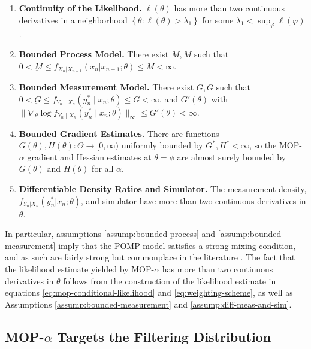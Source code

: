 \documentclass[numsec,webpdf,modern,medium,namedate]{oup-authoring-template}
\newcommand\arxiv[2]{#2} %
\theoremstyle{thmstyleone}%
\theoremstyle{thmstyletwo}%
\theoremstyle{thmstylethree}%
\begin{document}
\arxiv{}{\vspace*{-3ex}}
\begin{enumerate}[label=(A\arabic*),itemsep=-1ex, , font=\small] 
    \item \textbf{Continuity of the Likelihood.} $\ell(\theta)$ has more than two continuous derivatives in a neighborhood $\left\{\theta: \ell(\theta)>\lambda_1\right\}$ for some $\lambda_1<\sup _{\varphi} \ell(\varphi)$.\label{assump:conti-lik}
    \item \textbf{Bounded Process Model.} There exist $\underbar{M}, \bar{M}$ such that $0 < \underbar{M} \leq f_{X_n|X_{n-1}}(x_n | x_{n-1};\theta) \leq \bar{M} < \infty$.\label{assump:bounded-process}
    \item \textbf{Bounded Measurement Model.} There exist $\underbar{G}, \bar{G}$ such that $0<\underbar{G} \leq f_{Y_n \mid X_n}\left(y_n^* \mid x_n; \theta\right) \leq \bar{G}<\infty$, and $G'(\theta)$ with $\|\nabla_\theta \log f_{Y_n \mid X_n}\left(y_n^* \mid x_n; \theta\right)\|_\infty \leq G'(\theta)< \infty$.\label{assump:bounded-measurement}
    \item \textbf{Bounded Gradient Estimates.} There are functions $G(\theta), H(\theta): \Theta \to [0,\infty)$ uniformly bounded by $G^*, H^*<\infty$, so the MOP-$\alpha$ gradient and Hessian estimates at $\theta=\phi$ are almost surely bounded by $G(\theta)$ and $H(\theta)$ for all $\alpha$.\label{assump:local-bounded-derivative}
    \item \textbf{Differentiable Density Ratios and Simulator.} The measurement density, \arxiv{\\}{}$f_{Y_n|X_n}(y_n^*|x_n; \theta)$, and simulator have more than two continuous derivatives in $\theta$.\label{assump:diff-meas-and-sim}
\end{enumerate}
\arxiv{}{\vspace*{-3ex}}

In particular, assumptions \ref{assump:bounded-process} and \ref{assump:bounded-measurement} imply that the POMP model satisfies a strong mixing condition, and as such are fairly strong but commonplace in the literature \citep{karjalainen23, delMoral04}. The fact that the likelihood estimate yielded by MOP-$\alpha$ has more than two continuous derivatives in $\theta$ follows from the construction of the likelihood estimate in equations \ref{eq:mop-conditional-likelihood} and \ref{eq:weighting-scheme}, as well as Assumptions \ref{assump:bounded-measurement} and \ref{assump:diff-meas-and-sim}. 


\subsection{MOP-$\alpha$ Targets the Filtering Distribution}
\end{document}
